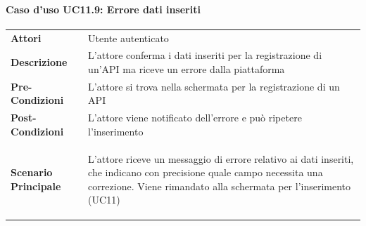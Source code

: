 \paragraph{Caso d'uso UC11.9: Errore dati inseriti}
\label{UC11_9}

\begin{minipage}{\linewidth}
	\begin{tabular}{ l | p{11cm}}
		\hline
		\rowcolor{Gray}
		\multicolumn{2}{c}{UC11.9 - Errore dati inserit} \\
		\hline
		\textbf{Attori} & Utente autenticato \\
		\textbf{Descrizione} & L'attore conferma i dati inseriti per la registrazione di un'API ma riceve un errore dalla piattaforma\\
		\textbf{Pre-Condizioni} & L'attore si trova nella schermata per la registrazione di un API\\
		\textbf{Post-Condizioni} & L'attore viene notificato dell'errore e può ripetere l'inserimento\\
		\textbf{Scenario Principale} & 
		\begin{enumerate*}[label=(\arabic*.),itemjoin={\newline}]
			\item L'attore riceve un messaggio di errore relativo ai dati inseriti, che indicano con precisione quale campo necessita una correzione. Viene rimandato alla schermata per l'inserimento (UC11)
		\end{enumerate*}\\
	\end{tabular}
\end{minipage}